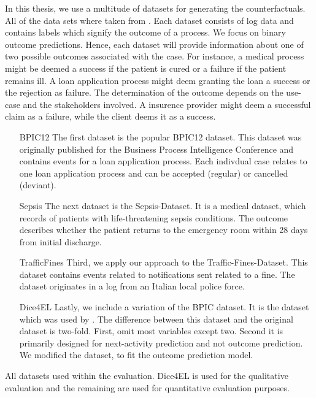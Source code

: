 \documentclass[./../../paper.tex]{subfiles}
\begin{document}
In this thesis, we use a multitude of datasets for generating the counterfactuals. All of the data sets where taken from \citeauthor{teinemaa_OutcomeOrientedPredictiveProcess_2018a}. Each dataset consists of log data and contains labels which signify the outcome of a process. We focus on binary outcome predictions. Hence, each dataset will provide information about one of two possible outcomes associated with the case. For instance, a medical process might be deemed a success if the patient is cured or a failure if the patient remains ill. A loan application process might deem granting the loan a success or the rejection as failure. The determination of the outcome depends on the use-case and the stakeholders involved. A insurence provider might deem a successful claim as a failure, while the client deems it as a success.

\begin{enumerate}
    \item[BPIC12] The first dataset is the popular BPIC12 dataset. This dataset was originally published for the Business Process Intelligence Conference and contains events for a loan application process. Each indivdual case relates to one loan application process and can be accepted (regular) or cancelled (deviant).
    \item[Sepsis] The next dataset is the Sepsis-Dataset. It is a medical dataset, which records of patients with life-threatening sepsis conditions. The outcome describes whether the patient returns to the emergency room within 28 days from initial discharge.
    \item[TrafficFines] Third, we apply our approach to the Traffic-Fines-Dataset. This dataset contains events related to notifications sent related to a fine. The dataset originates in a log from an Italian local police force.
    \item[Dice4EL] Lastly, we include a variation of the BPIC dataset. It is the dataset which was used by \citeauthor{hsieh_DiCE4ELInterpretingProcess_2021}. The difference between this dataset and the original dataset is two-fold. First, \citeauthor{hsieh_DiCE4ELInterpretingProcess_2021} omit most variables except two. Second it is primarily designed for next-activity prediction and not outcome prediction. We modified the dataset, to fit the outcome prediction model.
\end{enumerate}

\begin{table}[htbp]
        \makebox[\linewidth]{
            
            }
            \caption{All datasets used within the evaluation. Dice4EL is used for the qualitative evaluation and the remaining are used for quantitative evaluation purposes.}
            \label{tbl:dataset-stats}
\end{table}
\end{document}
